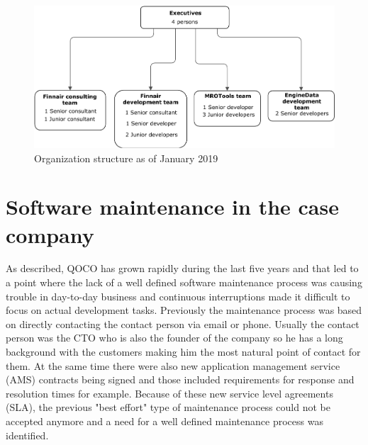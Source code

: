 \begin{figure}[H]
	\begin{center}
		\includegraphics[width=.9\textwidth]{images/Organization}
		\caption{Organization structure as of January 2019}
		\label{fig:organization}
	\end{center}
\end{figure}

\section{Software maintenance in the case company}
As described, QOCO has grown rapidly during the last five years and that led to a point where the lack of a well defined software maintenance process was causing trouble
in day-to-day business and continuous interruptions made it difficult to focus on actual development tasks. Previously the maintenance process was based on directly contacting the contact person
via email or phone. Usually the contact person was the CTO who is also the founder of the company so he has a long background with the customers making him the most natural point of
contact for them. At the same time there were also new application management service (AMS) contracts being signed and those included requirements for response and resolution times
for example. Because of these new service level agreements (SLA), the previous "best effort" type of maintenance process could not be accepted anymore and a need for a well defined
maintenance process was identified.

